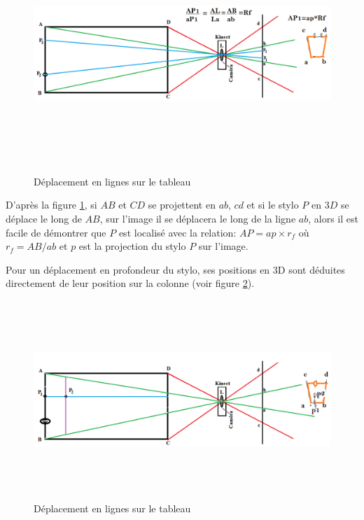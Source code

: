 \documentclass[12pt,a4paper,oneside]{book}
\begin{document}
	\begin{figure}[H]
		\centering
		\includegraphics[height=9cm ,width=15cm]{imn1.png}
		\caption{Déplacement en lignes sur le tableau}
		\label{fig1nn}
	\end{figure}
	
	D'après la figure \ref{fig1nn}, si $AB$ et $CD$ se projettent en $ab$, $cd$ et si le stylo $P$ en $3D$ se déplace le long de $AB$, sur l'image il se déplacera le long de la ligne $ab$, alors il est facile de démontrer que $P$ est localisé avec  la relation:
	$AP= ap \times r_f$ où $r_f=AB/ab$ et $p$ est la projection du stylo $P$ sur l'image.
	
	Pour un déplacement en profondeur du stylo, ses positions en 3D sont déduites directement de leur position sur la colonne (voir figure \ref{fig2nn}).
	
	\begin{figure}[H]
		\centering
		\includegraphics[height=7.5cm ,width=15cm]{imn2.png}
		\caption{Déplacement en lignes sur le tableau}
		\label{fig2nn}
	\end{figure}
	
\end{document}
